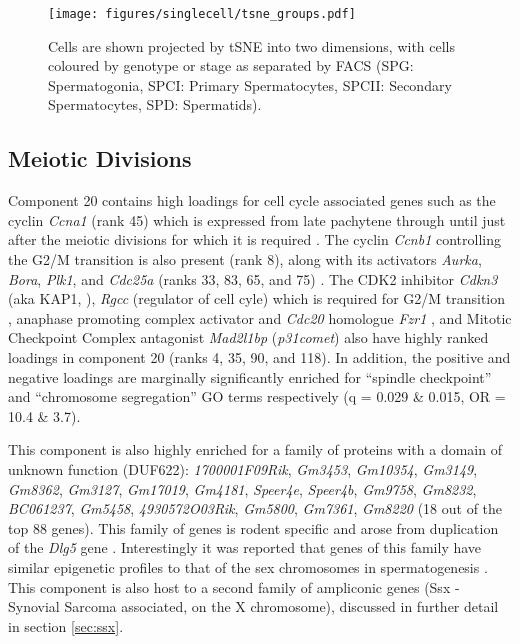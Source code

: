 \begin{figure}[H]
	\centering
	\texttt{[image: figures/singlecell/tsne\_groups.pdf]}
	\caption[Experimental groups in tSNE space]{
		Cells are shown projected by tSNE into two dimensions, with cells coloured by genotype or stage as separated by FACS (SPG: Spermatogonia, SPCI: Primary Spermatocytes, SPCII: Secondary Spermatocytes, SPD: Spermatids).
	}
	\label{fig:tsneGroups}
\end{figure}



\subsection{Meiotic Divisions}
Component 20 contains high loadings for cell cycle associated genes such as the cyclin \textit{Ccna1} (rank 45) which is expressed from late pachytene through until just after the meiotic divisions \parencite{Sweeney1996distinct} for which it is required \parencite{Liu1998Cyclin}. The cyclin \textit{Ccnb1} controlling the G2/M transition is also present (rank 8), along with its activators \textit{Aurka}, \textit{Bora}, \textit{Plk1}, and \textit{Cdc25a} (ranks 33, 83, 65, and 75) \parencite[reviewed in][]{Joukov2018AuroraPLK1}. The CDK2 inhibitor \textit{Cdkn3} (aka KAP1, \parencite{Poon1995Dephosphorylation}), \textit{Rgcc} (regulator of cell cyle) which is required for G2/M transition \parencite{Saigusa2007RGC32}, anaphase promoting complex activator and \textit{Cdc20} homologue \textit{Fzr1} \parencite{Holt2014APC}, and Mitotic Checkpoint Complex antagonist \textit{Mad2l1bp} (\textit{p31comet}) \parencite{Habu2002Identification} also have highly ranked loadings in component 20 (ranks 4, 35, 90, and 118). In addition, the positive and negative loadings are marginally significantly enriched for ``spindle checkpoint'' and ``chromosome segregation'' GO terms respectively (q = 0.029 \& 0.015, OR = 10.4 \& 3.7).

This component is also highly enriched for a family of proteins with a domain of unknown function (DUF622): \textit{1700001F09Rik}, \textit{Gm3453}, \textit{Gm10354}, \textit{Gm3149}, \textit{Gm8362}, \textit{Gm3127}, \textit{Gm17019}, \textit{Gm4181}, \textit{Speer4e}, \textit{Speer4b}, \textit{Gm9758}, \textit{Gm8232}, \textit{BC061237}, \textit{Gm5458}, \textit{4930572O03Rik}, \textit{Gm5800}, \textit{Gm7361}, \textit{Gm8220} (18 out of the top 88 genes). This family of genes is rodent specific and arose from duplication of the \textit{Dlg5} gene \parencite{Church2009Lineagespecific}. Interestingly it was reported that genes of this family have similar epigenetic profiles to that of the sex chromosomes in spermatogenesis \parencite{Moretti2016Expression}. This component is also host to a second family of ampliconic genes (Ssx - Synovial Sarcoma associated, on the X chromosome), discussed in further detail in section \ref{sec:ssx}.

